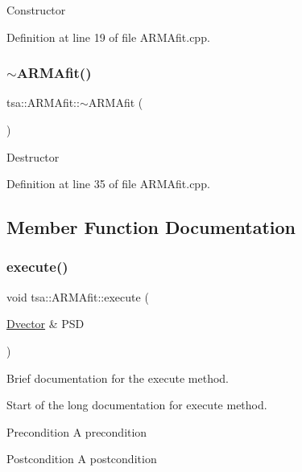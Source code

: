 Constructor 

Definition at line 19 of file A\+R\+M\+Afit.\+cpp.

\mbox{\label{classtsa_1_1_a_r_m_afit_a3e41abe33c5bdbd657ce48bbe1e21fe8}} 
\subsubsection{\texorpdfstring{$\sim$\+A\+R\+M\+Afit()}{~ARMAfit()}}
{\footnotesize\ttfamily tsa\+::\+A\+R\+M\+Afit\+::$\sim$\+A\+R\+M\+Afit (\begin{DoxyParamCaption}{ }\end{DoxyParamCaption})}

Destructor 

Definition at line 35 of file A\+R\+M\+Afit.\+cpp.



\subsection{Member Function Documentation}
\mbox{\label{classtsa_1_1_a_r_m_afit_a4ad977172d957bbcfee5a2eeba0ccdec}} 
\subsubsection{\texorpdfstring{execute()}{execute()}}
{\footnotesize\ttfamily void tsa\+::\+A\+R\+M\+Afit\+::execute (\begin{DoxyParamCaption}\item[{\hyperlink{namespacetsa_a8900fb03d849baf447a1a0efe2561fb2}{Dvector} \&}]{P\+SD }\end{DoxyParamCaption})}



Brief documentation for the execute method. 

Start of the long documentation for execute method.

\begin{DoxyPrecond}{Precondition}
A precondition 
\end{DoxyPrecond}
\begin{DoxyPostcond}{Postcondition}
A postcondition 
\end{DoxyPostcond}

